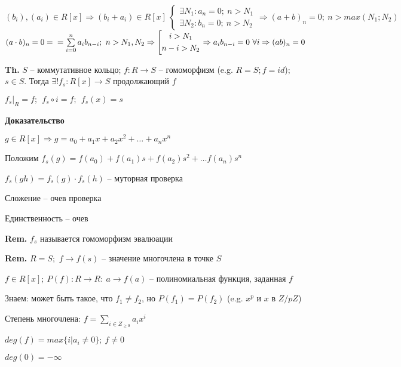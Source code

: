 \documentclass[14pt, letter paper]{article}
\begin{document}
$(b_i), (a_i) \in R[x] \Rightarrow (b_i + a_i) \in R[x]\ \begin{cases}
    \exists N_1 : a_n = 0;\ n > N_1 \\
    \exists N_2 : b_n = 0;\ n > N_2
\end{cases} \Rightarrow (a + b)_n = 0;\ n > max(N_1; N_2)$ $(a \cdot b)_n = 0 = \\ = \sum\limits_{i=0}^n a_ib_{n-i};\ n > N_1, N_2 \Rightarrow \left[ \begin{gathered}
    i > N_1 \\
    n - i > N_2
\end{gathered} \right. \Rightarrow a_ib_{n-i} = 0\ \forall i \Rightarrow (ab)_n = 0$

\vspace{5mm}

\textbf{Th.} $S$ -- коммутативное кольцо; $f : R \rightarrow S$ -- гомоморфизм (e.g. $R = S; f = id$); $s \in S$. Тогда $\exists! f_s : R[x] \rightarrow S$ продолжающий $f$

$f_s |_R = f;\ \ f_s \circ i = f;\ \ f_s(x) = s$

\begin{center}
    \textbf{Доказательство}
\end{center}

$g \in R[x] \Rightarrow g = a_0 + a_1x + a_2x^2 + \ldots + a_nx^n$

Положим $f_s(g) = f(a_0) + f(a_1)s + f(a_2)s^2 + \ldots f(a_n)s^n$

$f_s(gh) = f_s(g) \cdot f_s(h)$ -- муторная проверка

Сложение -- очев проверка

Единственность -- очев

\textbf{Rem.} $f_s$ называется гомоморфизм эвалюации

\textbf{Rem.} $R = S;$ $f \rightarrow f(s)$ -- значение многочлена в точке $S$

$f \in R[x];\ P(f) : R \rightarrow R:\ a \rightarrow f(a)$ -- полиномиальная функция, заданная $f$

Знаем: может быть такое, что $f_1 \neq f_2$, но $P(f_1) = P(f_2)$ (e.g. $x^p$ и $x$ в $Z/pZ$)

\vspace{5mm}

Степень многочлена: $f = \sum\limits_{i \in Z_{\geq 0}} a_ix^i$

$deg(f) = max\{i | a_i \neq 0\};\  f \neq 0$

$deg(0) = -\infty$
\end{document}
